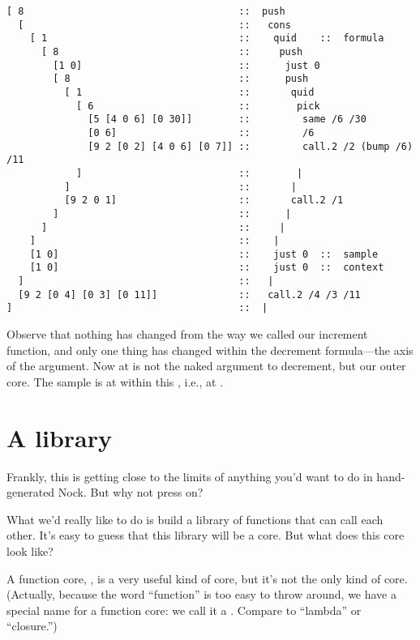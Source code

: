 \begin{framed_shaded}
\begin{Verbatim}[fontsize=\relsize{-2.5},fontseries=b,commandchars=\\\{\}]
[ 8                                     ::  push
  [                                     ::   cons
    [ 1                                 ::    quid    ::  formula
      [ 8                               ::     push
        [1 0]                           ::      just 0
        [ 8                             ::      push
          [ 1                           ::       quid
            [ 6                         ::        pick
              [5 [4 0 6] [0 30]]        ::         same /6 /30
              [0 6]                     ::         /6
              [9 2 [0 2] [4 0 6] [0 7]] ::         call.2 /2 (bump /6) /11
            ]                           ::        |
          ]                             ::       |
          [9 2 0 1]                     ::       call.2 /1
        ]                               ::      |
      ]                                 ::     |
    ]                                   ::    |
    [1 0]                               ::    just 0  ::  sample
    [1 0]                               ::    just 0  ::  context
  ]                                     ::   |
  [9 2 [0 4] [0 3] [0 11]]              ::   call.2 /4 /3 /11
]                                       ::  |
\end{Verbatim}
\end{framed_shaded}
Observe that nothing has changed from the way we called our
increment function, and only one thing has changed within the
decrement formula---the axis of the argument.  Now at  is not
the naked argument to decrement, but our outer core.  The sample
is at  within this , i.e., at .

\section{A library}

Frankly, this is getting close to the limits of anything you'd
want to do in hand-generated Nock.  But why not press on?

What we'd really like to do is build a library of functions that
can call each other.  It's easy to guess that this library will
be a core.  But what does this core look like?

A function core, , is a very useful
kind of core, but it's not the only kind of core.  (Actually,
because the word ``function'' is too easy to throw around, we have
a special name for a function core: we call it a .  Compare
to ``lambda'' or ``closure.'')

